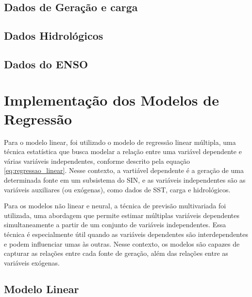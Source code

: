\subsection{Dados de Geração e carga} %

\subsection{Dados Hidrológicos} %

\subsection{Dados do ENSO} %


\section{Implementação dos Modelos de Regressão} %
Para o modelo linear, foi utilizado o modelo de regressão linear múltipla, uma técnica estatística que busca modelar
a relação entre uma variável dependente e várias variáveis independentes, conforme descrito pela equação \ref{eq:regressao_linear}.
Nesse contexto, a vartiável dependente é a geração de uma determinada fonte em um subsistema do SIN, e as variáveis independentes
são as variáveis auxiliares (ou exógenas), como dados de SST, carga e hidrológicos.

Para os modelos não linear e neural, a técnica de previsão multivariada foi utilizada, uma abordagem que permite estimar
múltiplas variáveis dependentes simultaneamente a partir de um conjunto de variáveis independentes. Essa técnica é especialmente 
útil quando as variáveis dependentes são interdependentes e podem influenciar umas às outras. Nesse contexto, 
os modelos são capazes de capturar as relações entre cada fonte de geração, além das relações entre as variáveis exógenas.

\subsection{Modelo Linear} %


